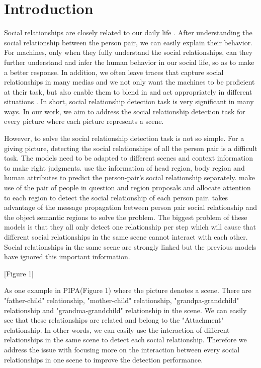 \documentclass{article}
\begin{document}
\section{Introduction}
Social relationships are closely related to our daily life \cite{DBLP:conf/wacv/BarrCBF14}. After understanding the social relationship between the person pair, we can easily explain their behavior. For machines, only when they fully understand the social relationships, can they further understand and infer the human behavior in our social life, so as to make a better response. In addition, we often leave traces that capture social relationships in many medias and we not only want the machines to be proficient at their task, but also enable them to blend in and
act appropriately in different situations \cite{DBLP:conf/cvpr/SunSF17}. In short, social relationship detection task is very significant in many ways. In our work, we aim to address the social relationship detection task for every picture where each picture represents a scene. 

However, to solve the social relationship detection task is not so simple. For a giving picture, detecting the social relationships of all the person pair is a difficult task. The models need to be adapted to different scenes and context information to make right judgments.  \cite{DBLP:conf/cvpr/SunSF17} use the information of head region, body region and human attributes to predict the person-pair's social relationship separately. \cite{DBLP:conf/iccv/LiWZK17} make use of the pair of people in question and region proposals and allocate attention to each region to detect the social relationship of each person pair. \cite{DBLP:conf/ijcai/WangCRYCL18} takes advantage of the message propagation between person pair social relationship and the object  semantic regions to solve the problem. The biggest problem of these models is that they all only detect one relationship per step which will cause that different social relationships in the same scene cannot interact with each other. Social relationships in the same scene are strongly linked but the previous models have ignored this important information.

[Figure 1]

As one example in PIPA(Figure 1) where the picture denotes a scene. There are "father-child" relationship, "mother-child" relationship, "grandpa-grandchild" relationship and "grandma-grandchild" relationship in the scene. We can easily see that these relationships are related and belong to the "Attachment" relationship. In other words, we can easily use the interaction of different relationships in the same scene to detect each social relationship. Therefore we address the issue with focusing more on the interaction between every social relationships in one scene to improve the detection performance.
\end{document}
